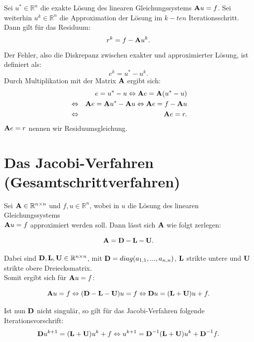 Sei $u^{*} \in \mathbb{R}^{n}$ die exakte Lösung des linearen Gleichungssystems ${\textbf{A}}u = f$. Sei weiterhin $u^{k} \in \mathbb{R}^{n}$ die Approximation der Lösung im $k-ten$ Iterationsschritt. Dann gilt für das Residuum:
\begin{equation}
r^{k} = f - {\textbf{A}} u^{k}.\label{eq.Residuum}
\end{equation}
Der Fehler, also die Diskrepanz zwischen exakter und approximierter Lösung, ist definiert als:
\begin{equation}
e^{k} = u^{*} - u^{k}.\label{eq.Fehler}
\end{equation}
Durch Multiplikation mit der Matrix ${\textbf{A}}$ ergibt sich:
\begin{eqnarray}
&&e = u^{*} - u \Leftrightarrow {\textbf{A}}e = {\textbf{A}}(u^{*} - u) \notag \\
&\Leftrightarrow& {\textbf{A}}e = {\textbf{A}} u^{*} - {\textbf{A}} u \Leftrightarrow {\textbf{A}}e = f - {\textbf{A}} u \notag \\
&\Leftrightarrow& {\textbf{A}}e = r.\label{eq.Residuumsgleichung}
\end{eqnarray}
${\textbf{A}}e = r$ nennen wir Residuumsgleichung.

\section{Das Jacobi-Verfahren (Gesamtschrittverfahren)}\label{s.Das Jacobi-Iterationsverfahren}

Sei ${\textbf{A}} \in \mathbb{R}^{n \times n}$ und $f,u \in \mathbb{R}^{n}$, wobei in $u$ die Lösung des linearen Gleichungssystems \\${\textbf{A}}u = f$ approximiert werden soll. Dann lässt sich ${\textbf{A}}$ wie folgt zerlegen:

\begin{equation}
{\textbf{A}} = {\textbf{D}} - {\textbf{L}} - {\textbf{U}}.
\end{equation}

Dabei sind ${\textbf{D}},{\textbf{L}},{\textbf{U}} \in \mathbb{R}^{n \times n}$, mit ${\textbf{D}} = diag(a_{1,1},...,a_{n,n})$, ${\textbf{L}}$ strikte untere und ${\textbf{U}}$ strikte obere Dreiecksmatrix. \\
Somit ergibt sich für ${\textbf{A}}u = f$:

\begin{equation}
{\textbf{A}}u = f \Leftrightarrow ({\textbf{D}}-{\textbf{L}}-{\textbf{U}})u = f \Leftrightarrow {\textbf{D}}u = ({\textbf{L}}+{\textbf{U}})u + f.
\end{equation}

Ist nun ${\textbf{D}}$ nicht singulär, so gilt für das Jacobi-Verfahren folgende Iterationsvorschrift:
\begin{equation}
{\textbf{D}}u^{k+1} = ({\textbf{L}}+{\textbf{U}})u^{k} + f \Leftrightarrow u^{k+1} = {\textbf{D}}^{-1}({\textbf{L}}+{\textbf{U}})u^{k} + {\textbf{D}}^{-1}f.
\end{equation}

